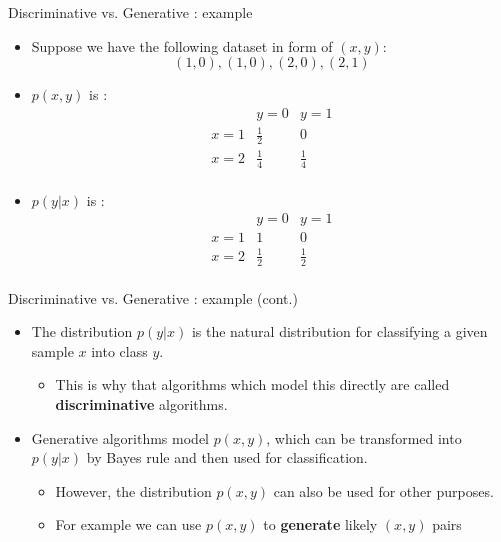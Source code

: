\documentclass[serif, aspectratio=169]{beamer}
\begin{document}
\begin{frame}{Discriminative vs. Generative : example}
    \begin{itemize}
        \item Suppose we have the following dataset in form of $(x, y)$:
            \[
                (1,0), (1,0), (2,0), (2,1)
            \]
        \item $p(x,y)$ is :
            \[
            \begin{array}{c|cc}
                & y=0 & y=1 \\
                \hline
            x=1 & \frac{1}{2} & 0 \\
            x=2 & \frac{1}{4} & \frac{1}{4} \\
            \end{array}
            \]
        \item $p(y|x)$ is :
            \[
            \begin{array}{c|cc}
                & y=0 & y=1 \\
                \hline
            x=1 & 1 & 0 \\
            x=2 & \frac{1}{2} & \frac{1}{2} \\
            \end{array}
            \]
    \end{itemize}
\end{frame}


\begin{frame}{Discriminative vs. Generative : example (cont.)}
    \begin{itemize}
        \item The distribution $p(y|x)$ is the natural distribution for classifying a given sample $x$ into class $y$.
            \begin{itemize}
                \item This is why that algorithms which model this directly are called \textbf{discriminative} algorithms.
            \end{itemize}
        \item Generative algorithms model $p(x,y)$, which can be transformed into $p(y|x)$ by Bayes rule and then used for classification.
            \begin{itemize}
                \item However, the distribution $p(x,y)$ can also be used for other purposes.
                \item For example we can use $p(x,y)$ to \textbf{generate} likely $(x,y)$ pairs
            \end{itemize}
    \end{itemize}
\end{frame}
\end{document}
